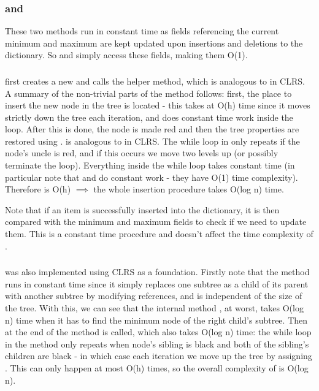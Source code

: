 \subsubsection{ and }
These two methods run in constant time as fields referencing the current minimum and maximum are kept updated upon insertions and deletions to the dictionary. So  and  simply access these fields, making them O(1).

\subsubsection{}
 first creates a new  and calls the  helper method, which is analogous to  in CLRS. A summary of the non-trivial parts of the method follows:
first, the place to insert the new node in the tree is located - this takes at O(h) time since it moves strictly down the tree each iteration, and does constant time work inside the loop. After this is done, the node is made red and then the tree properties are restored using .  is analogous to  in CLRS. The while loop in  only repeats if the node's uncle is red, and if this occurs we move two levels up (or possibly terminate the loop). Everything inside the while loop takes constant time (in particular note that  and  do constant work - they have O(1) time complexity). Therefore  is O(h) $\implies$ the whole insertion procedure takes O(log n) time.

Note that if an item is successfully inserted into the dictionary, it is then compared with the minimum and maximum fields to check if we need to update them. This is a constant time procedure and doesn't affect the time complexity of . 

\subsubsection{}
 was also implemented using CLRS as a foundation. Firstly note that the  method runs in constant time since it simply replaces one subtree as a child of its parent with another subtree by modifying references, and is independent of the size of the tree. With this, we can see that the internal method , at worst, takes O(log n) time when it has to find the minimum node of the right child's subtree. Then at the end of the method  is called, which also takes O(log n) time: the while loop in the method only repeats when node's sibling is black and both of the sibling's children are black - in which case each iteration we move up the tree by assigning . This can only happen at most O(h) times, so the overall complexity of  is O(log n).

